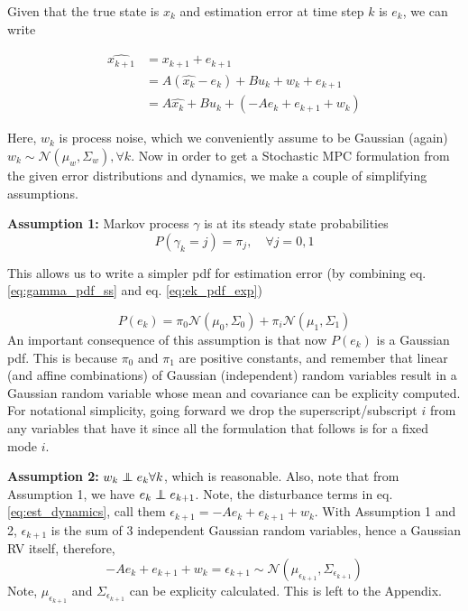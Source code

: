 \documentclass{article}[14pt]
\newcommand\independent{\protect\mathpalette{\protect\independenT}{\perp}}
\def\independenT#1#2{\mathrel{\rlap{$#1#2$}\mkern2mu{#1#2}}}
\begin{document}
Given that the true state is $x_k$ and estimation error at time step $k$ is $e_k$, we can write

\begin{subequations}
\begin{align}
\hat{x_{k+1}} &= x_{k+1} + e_{k+1} \nonumber \\
&= A(\hat{x_k}-e_k) + Bu_k + w_k + e_{k+1} \nonumber \\
&= A\hat{x_k}+ Bu_k + (-Ae_{k}+e_{k+1}+w_k)
\label{eq:est_dynamics}
\end{align}
\end{subequations}

Here, $w_k$ is process noise, which we conveniently assume to be Gaussian (again) $w_k\sim\mathcal{N}(\mu_w,\Sigma_w),\forall k$. Now in order to get a Stochastic MPC formulation from the given error distributions and dynamics, we make a couple of simplifying assumptions.

\textbf{Assumption 1:} Markov process $\gamma$ is at its steady state probabilities
\begin{equation}
P(\gamma_k=j) =  \pi_j ,\quad \forall j=0,1
\label{eq:gamma_pdf_ss}
\end{equation}

This allows us to write a simpler pdf for estimation error (by combining eq. \ref{eq:gamma_pdf_ss} and eq. \ref{eq:ek_pdf_exp})

\begin{equation}
P(e_k) = \pi_0\mathcal{N}(\mu_0,\Sigma_0) + \pi_i\mathcal{N}(\mu_1,\Sigma_1)
\label{eq:ek_pdf_ss}
\end{equation}
An important consequence of this assumption is that now $P(e_k)$ is a Gaussian pdf. This is because $\pi_0$ and $\pi_1$ are positive constants, and remember that linear (and affine combinations) of Gaussian (independent) random variables result in a Gaussian random variable whose mean and covariance can be explicity computed. 
For notational simplicity, going forward we drop the superscript/subscript $i$ from any variables that have it since all the formulation that follows is for a fixed mode $i$.


\textbf{Assumption 2:} $w_k \independent e_k \forall{k}$, which is reasonable. Also, note that from Assumption 1, we have $e_k \independent e_{k+1}$.
Note, the disturbance terms in eq. \ref{eq:est_dynamics}, call them $\epsilon_{k+1} = -Ae_{k}+e_{k+1}+w_k$. With Assumption 1 and 2, $\epsilon_{k+1}$ is the sum of 3 independent Gaussian random variables, hence a Gaussian RV itself, therefore,
\begin{equation}
 -Ae_{k}+e_{k+1}+w_k = \epsilon_{k+1}  \sim \mathcal{N}(\mu_{\epsilon_{k+1}},\Sigma_{\epsilon_{k+1}})
\label{eq:distr_pdf}
\end{equation}
Note, $\mu_{\epsilon_{k+1}}$ and $\Sigma_{\epsilon_{k+1}}$ can be explicity calculated. This is left to the Appendix.
\end{document}
